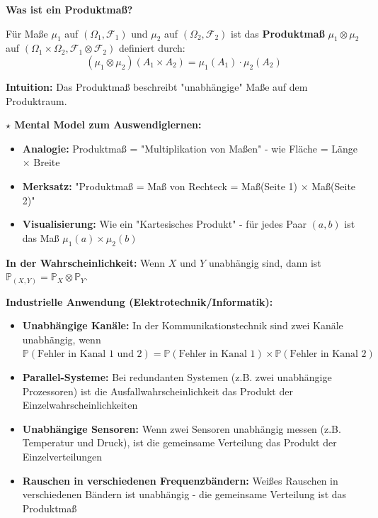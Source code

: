\begin{denoobification}[Produktmaß]
\textbf{Was ist ein Produktmaß?}

Für Maße $\mu_1$ auf $(\Omega_1, \mathcal{F}_1)$ und $\mu_2$ auf $(\Omega_2, \mathcal{F}_2)$ ist das \textbf{Produktmaß} $\mu_1 \otimes \mu_2$ auf $(\Omega_1 \times \Omega_2, \mathcal{F}_1 \otimes \mathcal{F}_2)$ definiert durch:
\[
(\mu_1 \otimes \mu_2)(A_1 \times A_2) = \mu_1(A_1) \cdot \mu_2(A_2)
\]

\textbf{Intuition:} Das Produktmaß beschreibt "unabhängige" Maße auf dem Produktraum.

\textbf{$\star$ Mental Model zum Auswendiglernen:}
\begin{itemize}
    \item \textbf{Analogie:} Produktmaß = "Multiplikation von Maßen" - wie Fläche = Länge × Breite
    \item \textbf{Merksatz:} "Produktmaß = Maß von Rechteck = Maß(Seite 1) × Maß(Seite 2)"
    \item \textbf{Visualisierung:} Wie ein "Kartesisches Produkt" - für jedes Paar $(a,b)$ ist das Maß $\mu_1(a) \times \mu_2(b)$
\end{itemize}

\textbf{In der Wahrscheinlichkeit:} Wenn $X$ und $Y$ unabhängig sind, dann ist $\mathbb{P}_{(X,Y)} = \mathbb{P}_X \otimes \mathbb{P}_Y$.

\textbf{Industrielle Anwendung (Elektrotechnik/Informatik):}
\begin{itemize}
    \item \textbf{Unabhängige Kanäle:} In der Kommunikationstechnik sind zwei Kanäle unabhängig, wenn $\mathbb{P}(\text{Fehler in Kanal 1 und 2}) = \mathbb{P}(\text{Fehler in Kanal 1}) \times \mathbb{P}(\text{Fehler in Kanal 2})$
    \item \textbf{Parallel-Systeme:} Bei redundanten Systemen (z.B. zwei unabhängige Prozessoren) ist die Ausfallwahrscheinlichkeit das Produkt der Einzelwahrscheinlichkeiten
    \item \textbf{Unabhängige Sensoren:} Wenn zwei Sensoren unabhängig messen (z.B. Temperatur und Druck), ist die gemeinsame Verteilung das Produkt der Einzelverteilungen
    \item \textbf{Rauschen in verschiedenen Frequenzbändern:} Weißes Rauschen in verschiedenen Bändern ist unabhängig - die gemeinsame Verteilung ist das Produktmaß
\end{itemize}


\end{denoobification}
